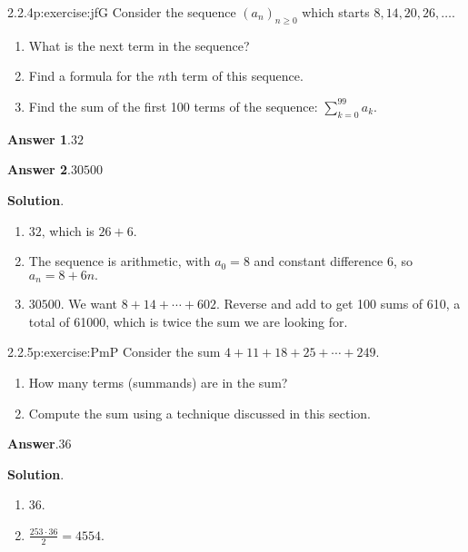 \documentclass[twoside,11pt,]{book}
\newcommand{\blocktitlefont}{\relax}
\numberwithin{equation}{chapter}
\begin{document}
\begin{divisionsolution}{2.2.4}{}{p:exercise:jfG}%
Consider the sequence \((a_n)_{n \ge 0}\) which starts \(8, 14, 20, 26, \ldots\text{.}\)%
\begin{enumerate}[label=(\alph*)]
\item{}What is the next term in the sequence?%
\item{}Find a formula for the \(n\)th term of this sequence.%
\item{}Find the sum of the first 100 terms of the sequence: \(\sum_{k=0}^{99}a_k\text{.}\)%
\end{enumerate}
%
\par\smallskip%
\noindent\textbf{\blocktitlefont Answer 1}.\quad{}\(32\)%
\par\smallskip%
\noindent\textbf{\blocktitlefont Answer 2}.\quad{}\(30500\)%
\par\smallskip%
\noindent\textbf{\blocktitlefont Solution}.\quad{}%
\begin{enumerate}[label=(\alph*)]
\item{}\(32\text{,}\) which is \(26+6\text{.}\)%
\item{}The sequence is arithmetic, with \(a_0 = 8\) and constant difference 6, so \(a_n = 8 + 6n\text{.}\)%
\item{}\(30500\text{.}\) We want \(8 + 14 + \cdots + 602\text{.}\) Reverse and add to get 100 sums of 610, a total of 61000, which is twice the sum we are looking for.%
\end{enumerate}
%
\end{divisionsolution}%
\begin{divisionsolution}{2.2.5}{}{p:exercise:PmP}%
Consider the sum \(4 + 11 + 18 + 25 + \cdots + 249\text{.}\)%
\begin{enumerate}[label=(\alph*)]
\item{}How many terms (summands) are in the sum?%
\item{}Compute the sum using a technique discussed in this section.%
\end{enumerate}
%
\par\smallskip%
\noindent\textbf{\blocktitlefont Answer}.\quad{}\(36\)%
\par\smallskip%
\noindent\textbf{\blocktitlefont Solution}.\quad{}%
\begin{enumerate}[label=(\alph*)]
\item{}36.%
\item{}\(\frac{253 \cdot 36}{2} = 4554\text{.}\)%
\end{enumerate}
%
\end{divisionsolution}%
\end{document}
